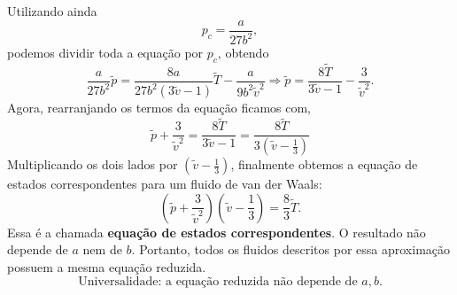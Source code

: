 \documentclass[11pt,a4paper]{article}
\begin{document}
%
Utilizando ainda
%
\begin{equation}
    p_c=\frac{a}{27b^2},
\end{equation}
%
podemos dividir toda a equação por $p_c$, obtendo
%
\begin{equation}
    \frac{a}{27b^2} \tilde p
    = \frac{8a}{27b^2(3 \tilde v - 1)} \tilde T - \frac{a}{9b^2 \tilde v^2} \Rightarrow  
    \tilde p = \frac{8\tilde T}{3\tilde v-1}
    -
    \frac{3}{\tilde v^2}.
\end{equation}
%
Agora, rearranjando os termos da equação ficamos com,
%
\begin{equation}
    \tilde p + \frac{3}{\tilde v^2}
    =
    \frac{8\tilde T}{3\tilde v-1} = \frac{8\tilde T}{3(\tilde v- \frac{1}{3})}     
\end{equation}
%
Multiplicando os dois lados por $(\tilde v - \frac{1}{3})$, finalmente obtemos a equação de estados correspondentes para um fluido de van der Waals:
%
\begin{equation}
    \boxed{
        \left(\tilde{p} + \frac{3}{\tilde{v}^2}\right) \left(\tilde{v} - \frac{1}{3}\right) = \frac{8}{3}\tilde{T}
    }.
    \label{eq:corresponding_states_vdw}
\end{equation}
%
Essa é a chamada \textbf{equação de estados correspondentes}. O resultado não depende de $a$ nem de $b$. Portanto, todos os fluidos descritos por essa aproximação possuem a mesma equação reduzida.
%
\begin{equation*}
    \boxed{\text{Universalidade: a equação reduzida não depende de }a,b.}
\end{equation*}
%
\end{document}
